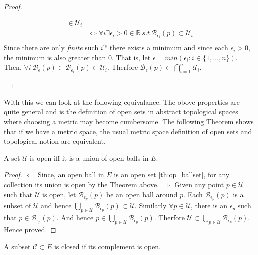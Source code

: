 \begin{proof}
\begin{enumerate}
\begin{displaymath}
\begin{aligned}
		       \in \mathcal{U}_i \\
		   & \Leftrightarrow \forall i  \exists \epsilon_i > 0 \in \mathbb{R} \ s.t \ 
		       \mathcal{B}_{\epsilon_i}(p) \subset \mathcal{U}_i \\
		\end{aligned}
	    \end{displaymath}
	    Since there are only \emph{finite} such $i^{'s}$ there exists a minimum and since 
	    each $\epsilon_i > 0$, the minimum is also greater than $0$. That is, let
	    $\epsilon = min \left( \epsilon_i : i \in \lbrace 1, \dots, n \rbrace \right)$. Then,
	   $ \forall i \ \mathcal{B}_{\epsilon}(p) \subset \mathcal{B}_{\epsilon_i}(p) \subset
	   \mathcal{U}_i$. Therfore $\mathcal{B}_{\epsilon}(p) \subset 
	   \bigcap_{i = 1}^n \mathcal{U}_i$.
	   
    \end{enumerate}
\end{proof}
With this we can look at the following equivalance. The obove properties are quite general and is 
the definition of open sets in abstract topological spaces where choosing a metric may become 
cumbersome. The following Theorem shows that if we have a metric space, the usual metric space 
definition of open sets and topological notion are equivalent.
\begin{Theorem}[name=Topological and metric space equivalence of open sets]
    A set $\mathcal{U}$ is open iff it is a union of open balls in $E$.
\end{Theorem}
\begin{proof}
    $\Leftarrow $ 
	Since, an open ball in $E$ is an open set \ref{th:op_ballset}, 
	for any collection its union is open by the Theorem above.
	$\Rightarrow$
    Given any point $p \in \mathcal{U}$ such that $\mathcal{U}$ is open, let
    $\mathcal{B}_{\epsilon_{p}}(p)$ be an open ball around $p$. Each $\mathcal{B}_{\epsilon_{p}}(p)$
    is a subset of $\mathcal{U}$ and hence $\bigcup_{p \in \mathcal{U}}\mathcal{B}_{\epsilon_{p}}(p)
    \subset \mathcal{U}$. Similarly $\forall p \in \mathcal{U}$, there is an $\epsilon_{p}$ such
    that $p \in \mathcal{B}_{\epsilon_{p}}(p)$. And hence $ p \in 
    \bigcup_{p \in \mathcal{U}}\mathcal{B}_{\epsilon_{p}}(p)$. Therfore $\mathcal{U} \subset 
    \bigcup_{p \in \mathcal{U}}\mathcal{B}_{\epsilon_{p}}(p)$. Hence proved.
    
\end{proof}
\begin{Definition}
    A subset $\mathcal{C} \subset E$ is closed if its complement is open.
\end{Definition}
